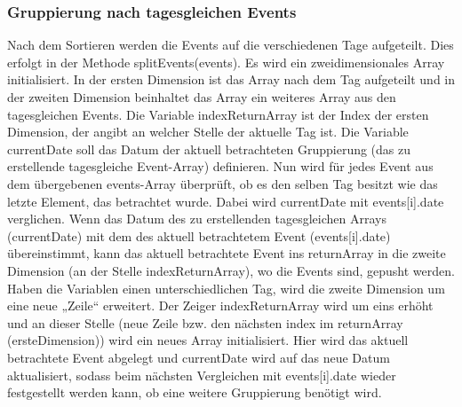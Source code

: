 {\subsubsection{Gruppierung nach tagesgleichen Events}
Nach dem Sortieren werden die Events auf die verschiedenen Tage aufgeteilt. Dies erfolgt in der Methode splitEvents(events). Es wird ein zweidimensionales Array initialisiert. In der ersten Dimension ist das Array nach dem Tag aufgeteilt und in der zweiten Dimension beinhaltet das Array ein weiteres Array aus den tagesgleichen Events. Die Variable indexReturnArray ist der Index der ersten Dimension, der angibt an welcher Stelle der aktuelle Tag ist. Die Variable currentDate soll das Datum der aktuell betrachteten Gruppierung (das zu erstellende tagesgleiche Event-Array) definieren. 
Nun wird für jedes Event aus dem übergebenen events-Array überprüft, ob es den selben Tag besitzt wie das letzte Element, das betrachtet wurde. Dabei wird currentDate mit events[i].date verglichen. 
Wenn das Datum des zu erstellenden tagesgleichen Arrays (currentDate) mit dem des aktuell betrachtetem Event (events[i].date) übereinstimmt, kann das aktuell betrachtete Event ins returnArray in die zweite Dimension (an der Stelle indexReturnArray), wo die Events sind, gepusht werden.
Haben die Variablen einen unterschiedlichen Tag, wird die zweite Dimension um eine neue „Zeile“ erweitert. Der Zeiger indexReturnArray wird um eins erhöht und an dieser Stelle (neue Zeile bzw. den nächsten index im returnArray (ersteDimension)) wird ein neues Array initialisiert. Hier wird das aktuell betrachtete Event abgelegt und currentDate wird auf das neue Datum aktualisiert, sodass beim nächsten Vergleichen mit events[i].date wieder festgestellt werden kann, ob eine weitere Gruppierung benötigt wird.

}
